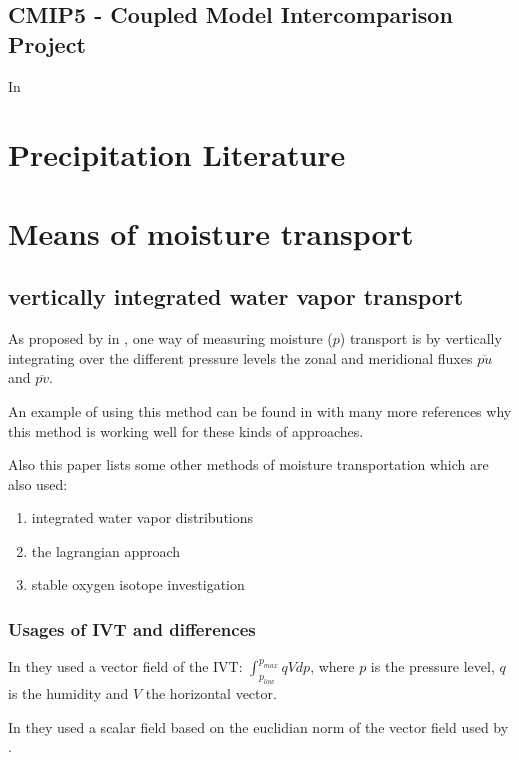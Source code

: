 \subsection{CMIP5 - Coupled Model Intercomparison Project}

In \cite{taylor_overview_2012}


\section{Precipitation Literature}


\section{Means of moisture transport}

\subsection{vertically integrated water vapor transport}

As proposed by \citeauthor{zhu_proposed_1998} in \cite{zhu_proposed_1998}, one way of measuring moisture ($p$) transport is by vertically integrating over the different pressure levels the zonal and meridional fluxes $\overline{pu}$ and $\overline{pv}$. 

An example of using this method can be found in \cite{ayantobo_integrated_2022} with many more references why this method is working well for these kinds of approaches. 

Also this paper lists some other methods of moisture transportation which are also used:

\begin{enumerate}
  \item integrated water vapor distributions
  \item the lagrangian approach
  \item stable oxygen isotope investigation
\end{enumerate}

\subsubsection{Usages of IVT and differences}

In \cite{ralph_dropsonde_2017} they used a vector field of the IVT: $\int_{p_{low}}^{p_{max}} qV dp$, where $p$ is the pressure level, $q$ is the humidity and $V$ the horizontal vector.

In \cite{sousa_north_2020} they used a scalar field based on the euclidian norm of the vector field used by \cite{ralph_dropsonde_2017}.



